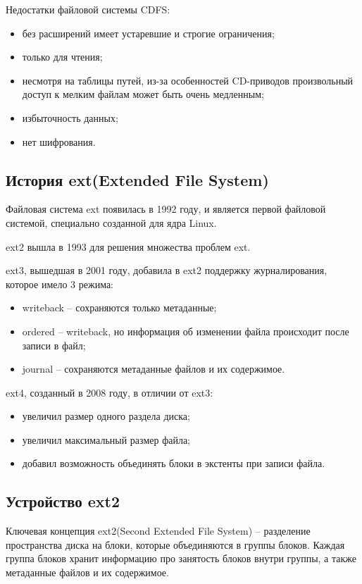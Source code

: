 Недостатки файловой системы CDFS:

\begin{itemize}
\item без расширений имеет устаревшие и строгие ограничения;
\item только для чтения;
\item несмотря на таблицы путей, из-за особенностей CD-приводов произвольный доступ к мелким файлам может быть очень медленным;
\item избыточность данных;
\item нет шифрования.
\end{itemize}

\subsection{История ext(Extended File System)}

Файловая система ext появилась в 1992 году, и является первой файловой системой, специально созданной для ядра Linux.

ext2 вышла в 1993 для решения множества проблем ext.

ext3, вышедшая в 2001 году, добавила в ext2 поддержку журналирования, которое имело 3 режима:

\begin{itemize}
\item writeback -- сохраняются только метаданные;
\item ordered -- writeback, но информация об изменении файла происходит после записи в файл;
\item journal -- сохраняются метаданные файлов и их содержимое.
\end{itemize}

ext4, созданный в 2008 году, в отличии от ext3:

\begin{itemize}
\item увеличил размер одного раздела диска;
\item увеличил максимальный размер файла;
\item добавил возможность объединять блоки в экстенты при записи файла.
\end{itemize}

\subsection{Устройство ext2}

Ключевая концепция ext2(Second Extended File System) -- разделение пространства диска на блоки, которые объединяются в группы блоков.
Каждая группа блоков хранит информацию про занятость блоков внутри группы, а также метаданные файлов и их содержимое.

